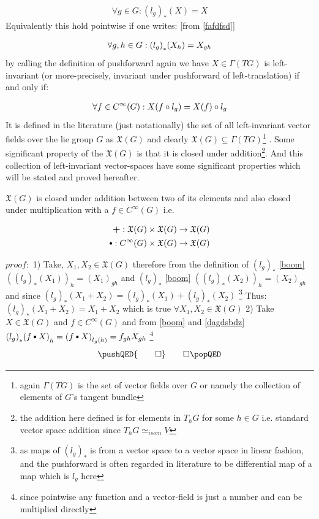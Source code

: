 \documentclass[8pt, twocoloumn]{article}
\begin{document}
\begin{align}
    \forall g \in G : {(l_g)}_{*}(X) = X
\end{align}
Equivalently this hold pointwise if one writes: [from \ref{fafdfsd}] 

\begin{align}{\label{boom}}
\forall g, h \in G: {(l_g)}_{*}(X_h)=X_{gh} 
\end{align}
 by calling the definition of pushforward again we have $X \in \Gamma(TG)$ is left-invariant (or more-precisely, invariant under pushforward of left-translation) if and only if:
 
 \begin{align}{\label{dagdsbdz}}
 \forall f \in C^{\infty}(G): X(f \circ l_g) = X(f) \circ l_g
 \end{align}
 It is defined in the literature (just notationally) the set of all left-invariant vector fields over the lie group $G$ as $\mathfrak{X}(G)$ and clearly $\mathfrak{X}(G) \subseteq \Gamma(TG)$\footnote{again $\Gamma(TG)$ is the set of vector fields over $G$ or namely the collection of elements of $G$'s tangent bundle} . Some significant property of the $\mathfrak{X}(G)$ is that it is closed under addition\footnote{the addition here defined is for elements in $T_hG$ for some $h\in G$ i.e. standard vector space addition since $T_hG \simeq_{isom} V$}. And this collection of left-invariant vector-spaces have some significant properties which will be stated and proved hereafter. 
 
 $\mathfrak{X}(G)$ is closed under addition between two of its elements and also closed under multiplication with a $f \in C^{\infty}(G)$ i.e.
 
 \begin{align}
    \begin{split}
        \textbf{+} : \mathfrak{X}(G) \times\mathfrak{X}(G) \to \mathfrak{X}(G) \notag 
     \end{split}\\
    \begin{split}
        \sbullet[.75]  : C^{\infty}(G)\times \mathfrak{X}(G) \to \mathfrak{X}(G) \nonumber
    \end{split}
\end{align}

$proof:$ 1) Take, $X_1, X_2 \in \mathfrak{X}(G)$ therefore from the definition of ${(l_g)}_{*}$ \ref{boom}      ${({(l_g)}_{*}(X_1) )}_{h}= {(X_1)}_{gh}$ and ${(l_g)}_{*}$ \ref{boom}      ${({(l_g)}_{*}(X_2) )}_{h}= {(X_2)}_{gh}$
 and since ${(l_g)}_{*}(X_1 + X_2) = {(l_g)}_{*}(X_1)+ {(l_g)}_{*}(X_2)$ \footnote{as maps of ${(l_g)}_{*}$ is from a vector space to a vector space in linear fashion, and the pushforward is often regarded in literature to be differential map of a map which is $l_g$ here} Thus: ${(l_g)}_{*}(X_1 + X_2) = X_1 + X_2$ which is true $\forall X_1, X_2 \in \mathfrak{X}(G)$ 
 2)  Take $X\in \mathfrak{X}(G)$ and $f \in C^{\infty}(G)$ and from \ref{boom} and \ref{dagdsbdz} ${{(l_g)}_{*}(f \sbullet[.75]   X ) }_{h}= {(f \sbullet[.75]   X)}_{l_g (h)} = f_{gh} X_{gh}$ \footnote{since pointwise any function and a vector-field is just a number and can be multiplied directly}
  \[
\pushQED{\qed} \qedhere
\popQED
\]  
 
\end{document}
